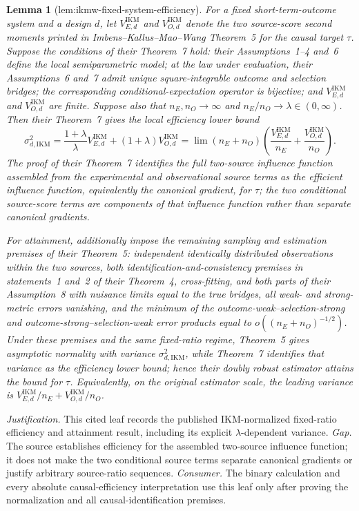 \documentclass{article}
\newtheorem{lemma}{Lemma}
\begin{document}
\begin{lemma}[lem:ikmw-fixed-system-efficiency]\label{lem:ikmw-fixed-system-efficiency}
For a fixed short-term-outcome system and a design \(d\), let \(V_{E,d}^{\mathrm{IKM}}\) and \(V_{O,d}^{\mathrm{IKM}}\) denote the two source-score second moments printed in Imbens--Kallus--Mao--Wang Theorem~5 for the causal target \(\tau\). Suppose the conditions of their Theorem~7 hold: their Assumptions~1--4 and~6 define the local semiparametric model; at the law under evaluation, their Assumptions~6 and~7 admit unique square-integrable outcome and selection bridges; the corresponding conditional-expectation operator is bijective; and \(V_{E,d}^{\mathrm{IKM}}\) and \(V_{O,d}^{\mathrm{IKM}}\) are finite. Suppose also that \(n_E,n_O\to\infty\) and \(n_E/n_O\to\lambda\in(0,\infty)\). Then their Theorem~7 gives the local efficiency lower bound
\[
 \sigma_{d,\mathrm{IKM}}^2
 =\frac{1+\lambda}{\lambda}V_{E,d}^{\mathrm{IKM}}
 +(1+\lambda)V_{O,d}^{\mathrm{IKM}}
 =\lim (n_E+n_O)\left(
 \frac{V_{E,d}^{\mathrm{IKM}}}{n_E}
 +\frac{V_{O,d}^{\mathrm{IKM}}}{n_O}
 \right).
\]
The proof of their Theorem~7 identifies the full two-source influence function assembled from the experimental and observational source terms as the efficient influence function, equivalently the canonical gradient, for \(\tau\); the two conditional source-score terms are components of that influence function rather than separate canonical gradients.

For attainment, additionally impose the remaining sampling and estimation premises of their Theorem~5: independent identically distributed observations within the two sources, both identification-and-consistency premises in statements~1 and~2 of their Theorem~4, cross-fitting, and both parts of their Assumption~8 with nuisance limits equal to the true bridges, all weak- and strong-metric errors vanishing, and the minimum of the outcome-weak--selection-strong and outcome-strong--selection-weak error products equal to \(o((n_E+n_O)^{-1/2})\). Under these premises and the same fixed-ratio regime, Theorem~5 gives asymptotic normality with variance \(\sigma_{d,\mathrm{IKM}}^2\), while Theorem~7 identifies that variance as the efficiency lower bound; hence their doubly robust estimator attains the bound for \(\tau\). Equivalently, on the original estimator scale, the leading variance is \(V_{E,d}^{\mathrm{IKM}}/n_E+V_{O,d}^{\mathrm{IKM}}/n_O\).
\end{lemma}
\par\smallskip\noindent \textit{Justification.} This cited leaf records the published IKM-normalized fixed-ratio efficiency and attainment result, including its explicit \(\lambda\)-dependent variance. \textit{Gap.} The source establishes efficiency for the assembled two-source influence function; it does not make the two conditional source terms separate canonical gradients or justify arbitrary source-ratio sequences. \textit{Consumer.} The binary calculation and every absolute causal-efficiency interpretation use this leaf only after proving the normalization and all causal-identification premises.
\end{document}
